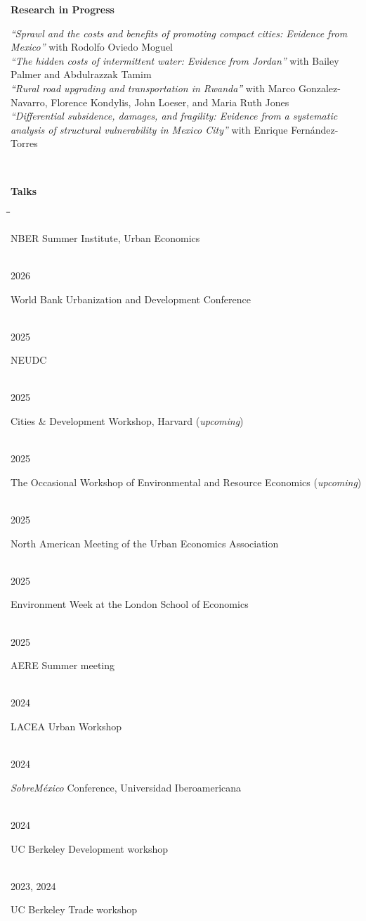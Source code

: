\documentclass[10pt, oneside]{article}
\makeatletter
\newlength\tdima
\newcommand\tabfill[1]{%
      \setlength\tdima{\linewidth}%
      \addtolength\tdima{\@totalleftmargin}%
      \addtolength\tdima{-\dimen\@curtab}%
      \parbox[t]{\tdima}{#1\ifhmode\strut\fi}}
\newcommand\mytabs{\hspace*{1cm}\=\hspace{1cm}\=\hspace{1cm}\=\hspace{1cm}\=\hspace{1cm}\=\hspace{1cm}\=\hspace{1cm}\=\hspace{1cm}\=\hspace{1cm}\=\hspace{1cm}}
\newenvironment{mysec}[1][\mytabs]
  {\begin{tabbing}#1\kill\ignorespaces}
  {\end{tabbing}}
\makeatother
\begin{document}
\begin{minipage}[t]{0.1\linewidth}
\textbf{Research in Progress}
\end{minipage}\hspace{0.05\linewidth}
\begin{minipage}[t]{0.8\linewidth}
\textit{``Sprawl and the costs and benefits of promoting compact cities: Evidence from Mexico''} with Rodolfo Oviedo Moguel \\ 

\textit{``The hidden costs of intermittent water: Evidence from Jordan''} with Bailey Palmer and Abdulrazzak Tamim\\ 

\textit{``Rural road upgrading and transportation in Rwanda''} with Marco Gonzalez-Navarro, Florence Kondylis, John Loeser, and Maria Ruth Jones\\ 

\textit{``Differential subsidence, damages, and fragility: Evidence from a systematic analysis of structural vulnerability in Mexico City''} with Enrique Fernández-Torres\\ 
\end{minipage}\\ 
\begin{minipage}[t]{0.1\linewidth}
\textbf{Talks}
\end{minipage}\hspace{0.05\linewidth}
\begin{minipage}[t]{0.8\linewidth}
\begin{mysec} 
    2026 \>\> \tabfill{NBER Summer Institute, Urban Economics} \\
    2026 \>\> \tabfill{World Bank Urbanization and Development Conference} \\
    2025 \>\> \tabfill{NEUDC} \\
    2025 \>\> \tabfill{Cities \& Development Workshop, Harvard (\textit{upcoming})} \\
    2025 \>\> \tabfill{The Occasional Workshop of Environmental and Resource Economics (\textit{upcoming})} \\
    2025 \>\> \tabfill{North American Meeting of the Urban Economics Association} \\
    2025 \>\> \tabfill{Environment Week at the London School of Economics} \\
    2025 \>\> \tabfill{AERE Summer meeting} \\
	2024 \>\> \tabfill{LACEA Urban Workshop} \\
    2024 \>\> \tabfill{\textit{SobreMéxico} Conference,  Universidad Iberoamericana}\\ 
    2024 \>\> \tabfill{UC Berkeley Development workshop} \\
    2023, 2024 \>\> \tabfill{UC Berkeley Trade workshop} \\
\end{mysec} 
\end{minipage}\vspace{5mm}
\end{document}
